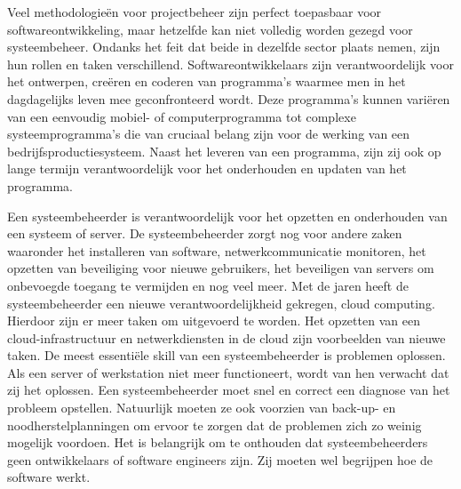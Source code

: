 \documentclass{hogent-article}
\begin{document}
    Veel methodologieën voor projectbeheer zijn perfect toepasbaar voor softwareontwikkeling, maar hetzelfde kan niet volledig worden gezegd voor systeembeheer. Ondanks het feit dat beide in dezelfde sector plaats nemen, zijn hun rollen en taken verschillend. Softwareontwikkelaars zijn verantwoordelijk voor het ontwerpen, creëren en coderen van programma’s waarmee men in het dagdagelijks leven mee geconfronteerd wordt. Deze programma’s kunnen variëren van een eenvoudig mobiel- of computerprogramma tot complexe systeemprogramma's die van cruciaal belang zijn voor de werking van een bedrijfsproductiesysteem. Naast het leveren van een programma, zijn zij ook op lange termijn verantwoordelijk voor het onderhouden en updaten van het programma. 
    
    Een systeembeheerder is verantwoordelijk voor het opzetten en onderhouden van een systeem of server. De systeembeheerder zorgt nog voor andere zaken waaronder het installeren van software, netwerkcommunicatie monitoren, het opzetten van beveiliging voor nieuwe gebruikers, het beveiligen van servers om onbevoegde toegang te vermijden en nog veel meer. Met de jaren heeft de systeembeheerder een nieuwe verantwoordelijkheid gekregen, cloud computing. Hierdoor zijn er meer taken om uitgevoerd te worden. Het opzetten van een cloud-infrastructuur en netwerkdiensten in de cloud zijn voorbeelden van nieuwe taken. De meest essentiële skill van een systeembeheerder is problemen oplossen. Als een server of werkstation niet meer functioneert, wordt van hen verwacht dat zij het oplossen. Een systeembeheerder moet snel en correct een diagnose van het probleem opstellen. Natuurlijk moeten ze ook voorzien van back-up- en noodherstelplanningen om ervoor te zorgen dat de problemen zich zo weinig mogelijk voordoen. Het is belangrijk om te onthouden dat systeembeheerders geen ontwikkelaars of software engineers zijn. Zij moeten wel begrijpen hoe de software werkt.
    
\end{document}
